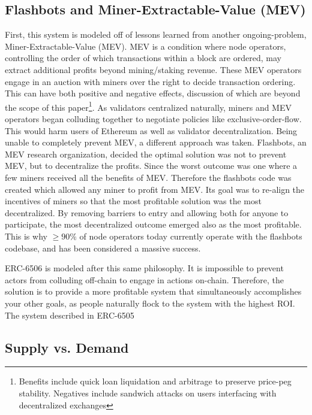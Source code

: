 \documentclass{article}
\begin{document}
\subsection{Flashbots and Miner-Extractable-Value (MEV)}
First, this system is modeled off of lessons learned from another ongoing-problem, Miner-Extractable-Value (MEV). MEV is a condition where node operators, controlling the order of which transactions within a block are ordered, may extract additional profits beyond mining/staking revenue. These MEV operators engage in an auction with miners over the right to decide transaction ordering. This can have both positive and negative effects, discussion of which are beyond the scope of this paper\footnote{Benefits include quick loan liquidation and arbitrage to preserve price-peg stability. Negatives include sandwich attacks on users interfacing with decentralized exchanges}. As validators centralized naturally, miners and MEV operators began colluding together to negotiate policies like exclusive-order-flow. This would harm users of Ethereum as well as validator decentralization. Being unable to completely prevent MEV, a different approach was taken. Flashbots, an MEV research organization, decided the optimal solution was not to prevent MEV, but to decentralize the profits. Since the worst outcome was one where a few miners received all the benefits of MEV. Therefore the flashbots code was created which allowed any miner to profit from MEV. Its goal was to re-align the incentives of miners so that the most profitable solution was the most decentralized. By removing barriers to entry and allowing both for anyone to participate, the most decentralized outcome emerged also as the most profitable. This is why $\ge 90\%$ of node operators today currently operate with the flashbots codebase, and has been considered a massive success.

ERC-6506 is modeled after this same philosophy. It is impossible to prevent actors from colluding off-chain to engage in actions on-chain. Therefore, the solution is to provide a more profitable system that simultaneously accomplishes your other goals, as people naturally flock to the system with the highest ROI. The system described in ERC-6505

\subsection{Supply vs. Demand}
\end{document}
